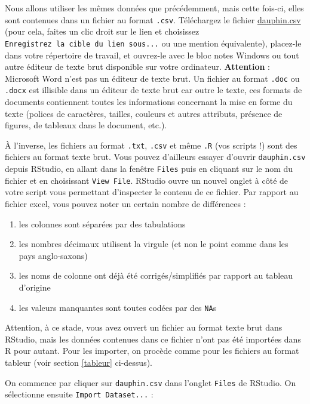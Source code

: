 \documentclass[a4paperpaper,]{article}
\providecommand{\tightlist}{%
  \setlength{\itemsep}{0pt}\setlength{\parskip}{0pt}}
\theoremstyle{definition}
\theoremstyle{definition}
\theoremstyle{definition}
\theoremstyle{remark}
\begin{document}
Nous allons utiliser les mêmes données que précédemment, mais cette
fois-ci, elles sont contenues dans un fichier au format \texttt{.csv}.
Téléchargez le fichier \href{data/dauphin.csv}{dauphin.csv} (pour cela,
faites un clic droit sur le lien et choisissez
\texttt{Enregistrez\ la\ cible\ du\ lien\ sous...} ou une mention
équivalente), placez-le dans votre répertoire de travail, et ouvrez-le
avec le bloc notes Windows ou tout autre éditeur de texte brut
disponible sur votre ordinateur. \textbf{Attention} : Microsoft Word
n'est pas un éditeur de texte brut. Un fichier au format \texttt{.doc}
ou \texttt{.docx} est illisible dans un éditeur de texte brut car outre
le texte, ces formats de documents contiennent toutes les informations
concernant la mise en forme du texte (polices de caractères, tailles,
couleurs et autres attributs, présence de figures, de tableaux dans le
document, etc.).

À l'inverse, les fichiers au format \texttt{.txt}, \texttt{.csv} et même
\texttt{.R} (vos scripts !) sont des fichiers au format texte brut. Vous
pouvez d'ailleurs essayer d'ouvrir \texttt{dauphin.csv} depuis RStudio,
en allant dans la fenêtre \texttt{Files} puis en cliquant sur le nom du
fichier et en choisissant \texttt{View\ File}. RStudio ouvre un nouvel
onglet à côté de votre script vous permettant d'inspecter le contenu de
ce fichier. Par rapport au fichier excel, vous pouvez noter un certain
nombre de différences :

\begin{enumerate}
\def\labelenumi{\arabic{enumi}.}
\tightlist
\item
  les colonnes sont séparées par des tabulations
\item
  les nombres décimaux utilisent la virgule (et non le point comme dans
  les pays anglo-saxons)
\item
  les noms de colonne ont déjà été corrigés/simplifiés par rapport au
  tableau d'origine
\item
  les valeurs manquantes sont toutes codées par des \texttt{NA}s
\end{enumerate}

Attention, à ce stade, vous avez ouvert un fichier au format texte brut
dans RStudio, mais les données contenues dans ce fichier n'ont pas été
importées dans R pour autant. Pour les importer, on procède comme pour
les fichiers au format tableur (voir section \ref{tableur} ci-dessus).

On commence par cliquer sur \texttt{dauphin.csv} dans l'onglet
\texttt{Files} de RStudio. On sélectionne ensuite
\texttt{Import\ Dataset...} :
\end{document}
